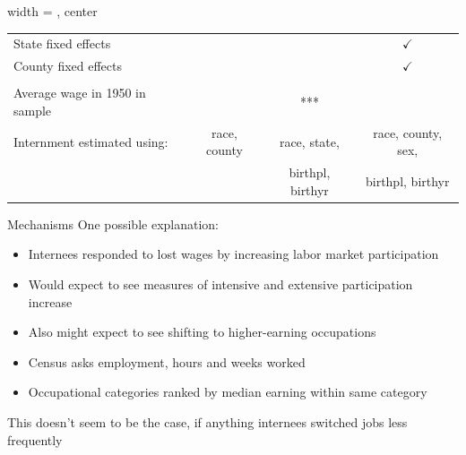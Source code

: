 \documentclass{beamer}
\begin{document}
\begin{frame}
\begin{table}[htbp]
\begin{adjustbox}{width = \textwidth, center}
\begin{tabular}{lccc}
         State fixed effects                                          &                 &                 & $\checkmark$\\   
         County fixed effects                                         &                 &                 & $\checkmark$\\   
         \\
         Average wage in 1950 in sample                               & & *** & & \\
         Internment estimated using:                                  & race, county    & race, state,  & race, county, sex, \\
                                                                      &                 & birthpl, birthyr & birthpl, birthyr \\
         \bottomrule
      \end{tabular}
     \end{adjustbox}
  \end{table}
\end{frame}

\begin{frame}{Mechanisms}
  One possible explanation:
  \begin{itemize}
    \item Internees responded to lost wages by increasing labor market participation
    \item Would expect to see measures of intensive and extensive participation increase
    \item Also might expect to see shifting to higher-earning occupations
    \item Census asks employment, hours and weeks worked
    \item Occupational categories ranked by median earning within same category
  \end{itemize}
  This doesn't seem to be the case, if anything internees switched jobs less frequently
\end{frame}
\end{document}
